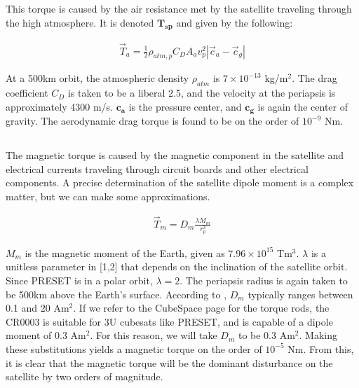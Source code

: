 \documentclass{article}
\begin{document}
This torque is caused by the air resistance met by the satellite traveling through the high atmosphere. It is denoted $\mathbf{T_{sp}}$ and given by the following:

\begin{align}
    \vec{T}_{a} = \frac{1}{2} \rho_{atm,p} C_{D} A_{a} v_{p}^2 |\vec{c}_{a} - \vec{c}_{g}| \tag{2.3}
\end{align}

 At a 500km orbit, the atmospheric density $\rho_{atm}$ is $7 \times 10^{-13}$ kg/m$^2$. The drag coefficient $C_{D}$ is taken to be a liberal 2.5, and the velocity at the periapsis is approximately 4300 m/s. $\mathbf{c_{a}}$ is the pressure center, and $\mathbf{c_{g}}$ is again the center of gravity. The aerodynamic drag torque is found to be on the order of $10^{-9}$ Nm. 

\subsection{\color{black}{Magnetic Torque}}

The magnetic torque is caused by the magnetic component in the satellite and electrical currents traveling through circuit boards and other electrical components. A precise determination of the satellite dipole moment is a complex matter, but we can make some approximations.

\begin{align}
    \vec{T}_{m} = D_{m} \frac{\lambda M_{m}}{r_{p}^3} \tag{2.4}
\end{align}

 $M_{m}$ is the magnetic moment of the Earth, given as $7.96 \times 10^{15}$ Tm$^{3}$. $\lambda$ is a unitless parameter in [1,2] that depends on the inclination of the satellite orbit. Since PRESET is in a polar orbit, $\lambda=2$. The periapsis radius is again taken to be 500km above the Earth's surface. According to \cite{nanostar}, $D_{m}$ typically ranges between 0.1 and 20 Am$^2$. If we refer to the CubeSpace page for the torque rods, the CR0003 is suitable for 3U cubesats like PRESET, and is capable of a dipole moment of 0.3 Am$^2$. For this reason, we will take $D_{m}$ to be 0.3 Am$^2$. Making these substitutions yields a magnetic torque on the order of $10^{-5}$ Nm. From this, it is clear that the magnetic torque will be the dominant disturbance on the satellite by two orders of magnitude. 

\newpage

\section{\color{black}{Attitude Determination and Control Systems}}
\end{document}
